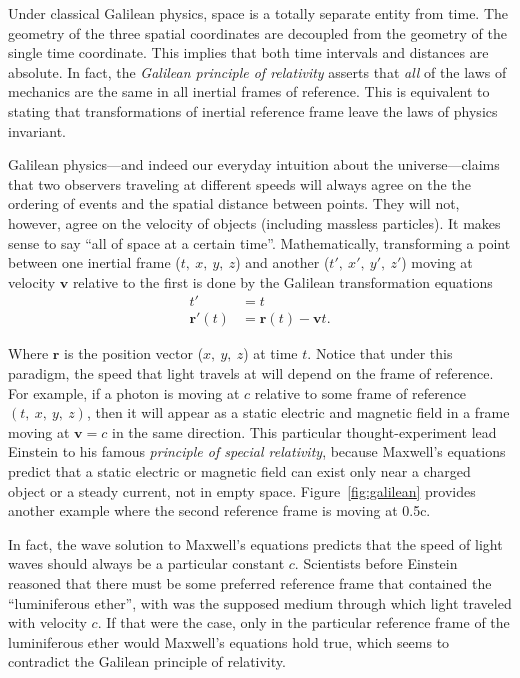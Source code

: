\documentclass[titlepage,letterpaper,onecolumn,11pt,final]{report}
\numberwithin{equation}{section}
\numberwithin{figure}{section}
\begin{document}
Under classical Galilean physics, space is a totally separate entity from time. The geometry of the three spatial coordinates are decoupled from the geometry of the single time coordinate. This implies that both time intervals and distances are absolute. In fact, the \emph{Galilean principle of relativity} asserts that \emph{all} of the laws of mechanics are the same in all inertial frames of reference. This is equivalent to stating that transformations of inertial reference frame leave the laws of physics invariant. 

Galilean physics---and indeed our everyday intuition about the universe---claims that two observers traveling at different speeds will always agree on the the ordering of events and the spatial distance between points. They will not, however, agree on the velocity of objects (including massless particles). It makes sense to say ``all of space at a certain time''. Mathematically, transforming a point between one inertial frame ($t,\ x,\ y,\ z$) and another ($t',\ x',\ y',\ z'$) moving at velocity $\mathbf{v}$ relative to the first is done by the Galilean transformation equations
\begin{subequations}
\begin{align}
	\label{eq:Galilean_transform}
	t' &= t \\
	\mathbf{r}'(t) &= \mathbf{r}(t) - \mathbf{v}t .
\end{align}
\end{subequations}

Where $\mathbf{r}$ is the position vector ($x,\ y,\ z$) at time $t$. Notice that under this paradigm, the speed that light travels at will depend on the frame of reference. For example, if a photon is moving at $c$ relative to some frame of reference $(t,\ x,\ y,\ z)$, then it will appear as a static electric and magnetic field in a frame moving at $\mathbf{v} = c$ in the same direction. This particular thought-experiment lead Einstein to his famous \emph{principle of special relativity}, because Maxwell's equations predict that a static electric or magnetic field can exist only near a charged object or a steady current, not in empty space. Figure~\ref{fig:galilean} provides another example where the second reference frame is moving at 0.5c.

In fact, the wave solution to Maxwell's equations predicts that the speed of light waves should always be a particular constant $c$. Scientists before Einstein reasoned that there must be some preferred reference frame that contained the ``luminiferous ether'', with was the supposed medium through which light traveled with velocity $c$. If that were the case, only in the particular reference frame of the luminiferous ether would Maxwell's equations hold true, which seems to contradict the Galilean principle of relativity.
\end{document}
